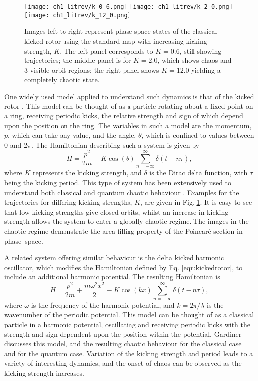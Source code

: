 \begin{figure}[tb]
\centering
\texttt{[image: ch1\_litrev/k\_0\_6.png]}
\texttt{[image: ch1\_litrev/k\_2\_0.png]}
\texttt{[image: ch1\_litrev/k\_12\_0.png]}
\caption{Images left to right represent phase space states of the classical kicked rotor using the standard map with increasing kicking strength, $K$. The left panel corresponds to $K=0.6$, still showing trajectories; the middle panel is for $K=2.0$, which shows chaos and 3 visible orbit regions; the right panel shows $K=12.0$ yielding a completely chaotic state.}
\label{fig:kickedrotor}
\end{figure}

One widely used model applied to understand such dynamics is that of the kicked rotor \cite{CT:Korsch_ajp_2008}. This model can be thought of as a particle rotating about a fixed point on a ring, receiving periodic kicks, the relative strength and sign of which depend upon the position on the ring. The variables in such a model are the momentum, $p$, which can take any value, and the angle, $\theta$, which is confined to values between 0 and 2$\pi$. The Hamiltonian describing such a system is given by
\begin{equation} \label{eqn:kickedrotor}
H = \frac{p^2}{2m} - K\cos(\theta)\displaystyle\sum_{n=-\infty}^{\infty}\delta(t-n\tau),
\end{equation}
where $K$ represents the kicking strength, and $\delta$ is the Dirac delta function, with $\tau$ being the kicking period. This type of system has been extensively used to understand both classical and quantum chaotic behaviour \cite{CT:Ulah_thesis_2012}. Examples for the trajectories for differing kicking strengths, $K$, are given in Fig. \ref{fig:kickedrotor}. It is easy to see that low kicking strengths give closed orbits, whilst an increase in kicking strength allows the system to enter a globally chaotic regime. The images in the chaotic regime demonstrate the area-filling property of the Poincar\'e section in phase--space.

A related system offering similar behaviour is the delta kicked harmonic oscillator, which modifies the Hamiltonian defined by Eq. \eqref{eqn:kickedrotor}, to include an additional harmonic potential. The resulting Hamiltonian is
\begin{equation}\label{eqn:deltaharmosc}
H = \frac{p^2}{2m} + \frac{m\omega^2 x^2}{2} - K\cos(kx)\displaystyle\sum_{n=-\infty}^{\infty}\delta(t-n\tau),
\end{equation}
where $\omega$ is the frequency of the harmonic potential, and $k=2\pi/\lambda$ is the wavenumber of the periodic potential.  This model can be thought of as a classical particle in a harmonic potential, oscillating and receiving periodic kicks with the strength and sign dependent upon the position within the potential. Gardiner \cite[chap. 4]{THS:Gardiner_2000} discusses this model, and the resulting chaotic behaviour for the classical case and for the quantum case. Variation of the kicking strength and period leads to a variety of interesting dynamics, and the onset of chaos can be observed as the kicking strength increases.

